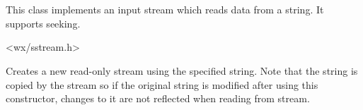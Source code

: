 
\section{}\label{wxstringinputstream}

This class implements an input stream which reads data from a string. It
supports seeking.




<wx/sstream.h>





\label{wxstringinputstreamctor}


Creates a new read-only stream using the specified string. Note that the string
is copied by the stream so if the original string is modified after using this
constructor, changes to it are not reflected when reading from stream. 

